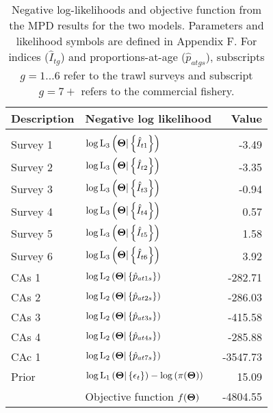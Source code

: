\documentclass[11pt]{book}
\def\bfTh{{\bf \Theta}}  %
\begin{document}
\begin{table}[!p]
\centering
\caption{\label{tab:like}  Negative log-likelihoods and objective function from the MPD results for the two models. Parameters and likelihood symbols are defined in Appendix F. For indices ($\hat{I}_{tg}$) and proportions-at-age ($\hat{p}_{atgs}$), subscripts $g=1...6$ refer to the trawl surveys and subscript $g=7+$ refers to the commercial fishery.}
\begin{tabular}{llr} 
\hline
Description & Negative log likelihood & Value \\
\hline \\[0.2pt]
Survey 1 & $\log \mbox{L}_{3} \left( \bfTh | \left\{ \hat{I}_{t1} \right\} \right)$ & -3.49\\[6pt]
Survey 2 & $\log \mbox{L}_{3} \left( \bfTh | \left\{ \hat{I}_{t2} \right\} \right)$ & -3.35\\[6pt]
Survey 3 & $\log \mbox{L}_{3} \left( \bfTh | \left\{ \hat{I}_{t3} \right\} \right)$ & -0.94\\[6pt]
Survey 4 & $\log \mbox{L}_{3} \left( \bfTh | \left\{ \hat{I}_{t4} \right\} \right)$ & 0.57\\[6pt]
Survey 5 & $\log \mbox{L}_{3} \left( \bfTh | \left\{ \hat{I}_{t5} \right\} \right)$ & 1.58\\[6pt]
Survey 6 & $\log \mbox{L}_{3} \left( \bfTh | \left\{ \hat{I}_{t6} \right\} \right)$ & 3.92\\[6pt]
CAs 1    & $\log \mbox{L}_{2} \left( \bfTh | \left\{ \hat{p}_{at1s} \right\} \right)$ & -282.71 \\[6pt] 
CAs 2    & $\log \mbox{L}_{2} \left( \bfTh | \left\{ \hat{p}_{at2s} \right\} \right)$ & -286.03 \\[6pt] 
CAs 3    & $\log \mbox{L}_{2} \left( \bfTh | \left\{ \hat{p}_{at3s} \right\} \right)$ & -415.58 \\[6pt] 
CAs 4    & $\log \mbox{L}_{2} \left( \bfTh | \left\{ \hat{p}_{at4s} \right\} \right)$ & -285.88 \\[6pt] 
CAc 1    & $\log \mbox{L}_{2} \left( \bfTh | \left\{ \hat{p}_{at7s} \right\} \right)$ & -3547.73 \\[6pt] 
Prior    & $\log \mbox{L}_{1} \left( \bfTh | \left\{ \epsilon_t \right\} \right) - \log \left( \pi( \bfTh ) \right)$ & 15.09 \\[6pt]  

\hline
~ & Objective function $f( \bfTh)$ & -4804.55 \\
\hline
\end{tabular}
\end{table}
\end{document}
